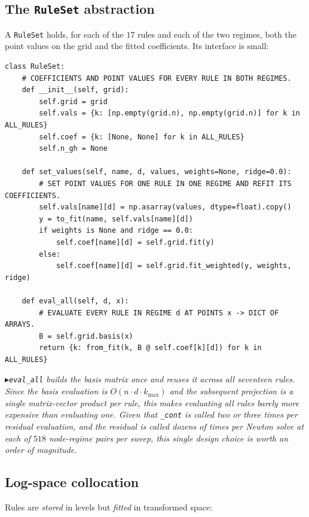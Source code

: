 \documentclass[11pt]{article}
\numberwithin{equation}{section}
\newcommand{\code}[1]{\texttt{\small #1}}
\theoremstyle{definition}
\theoremstyle{plain}
\theoremstyle{remark}
\newcommand{\trick}[1]{\par\smallskip\noindent
  \textcolor{notec}{$\blacktriangleright$}\;\emph{#1}\par\smallskip}
\begin{document}
\subsection{The \code{RuleSet} abstraction}

A \code{RuleSet} holds, for each of the $17$ rules and each of the two regimes, both
the point values on the grid and the fitted coefficients. Its interface is small:

\begin{lstlisting}[caption={The rule container. \code{decision\_rules.py}.}]
class RuleSet:
    # COEFFICIENTS AND POINT VALUES FOR EVERY RULE IN BOTH REGIMES.
    def __init__(self, grid):
        self.grid = grid
        self.vals = {k: [np.empty(grid.n), np.empty(grid.n)] for k in ALL_RULES}
        self.coef = {k: [None, None] for k in ALL_RULES}
        self.n_gh = None

    def set_values(self, name, d, values, weights=None, ridge=0.0):
        # SET POINT VALUES FOR ONE RULE IN ONE REGIME AND REFIT ITS COEFFICIENTS.
        self.vals[name][d] = np.asarray(values, dtype=float).copy()
        y = to_fit(name, self.vals[name][d])
        if weights is None and ridge == 0.0:
            self.coef[name][d] = self.grid.fit(y)
        else:
            self.coef[name][d] = self.grid.fit_weighted(y, weights, ridge)

    def eval_all(self, d, x):
        # EVALUATE EVERY RULE IN REGIME d AT POINTS x -> DICT OF ARRAYS.
        B = self.grid.basis(x)
        return {k: from_fit(k, B @ self.coef[k][d]) for k in ALL_RULES}
\end{lstlisting}

\trick{\code{eval\_all} builds the basis matrix \emph{once} and reuses it across all
seventeen rules. Since the basis evaluation is $O(n\cdot d\cdot k_{\max})$ and the
subsequent projection is a single matrix-vector product per rule, this makes
evaluating all rules barely more expensive than evaluating one. Given that
\code{\_cont} is called two or three times per residual evaluation, and the residual
is called dozens of times per Newton solve at each of $518$ node-regime pairs per
sweep, this single design choice is worth an order of magnitude.}

\subsection{Log-space collocation}

Rules are \emph{stored} in levels but \emph{fitted} in transformed space:
\end{document}
